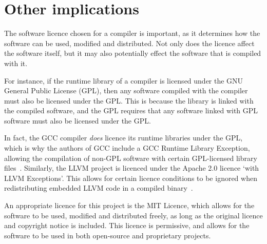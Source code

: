 \section{Other implications}

The software licence chosen for a compiler is important, as it determines how the software can be
used, modified and distributed. Not only does the licence affect the software itself, but it may
also potentially effect the software that is compiled with it.

For instance, if the runtime library of a compiler is licensed under the GNU General Public
License (GPL), then any software compiled with the compiler must also be licensed under the GPL.
This is because the library is linked with the compiled software, and the GPL requires that any
software linked with GPL software must also be licensed under the GPL.

In fact, the GCC compiler \emph{does} licence its runtime libraries under the GPL, which is why the
authors of GCC include a GCC Runtime Library Exception, allowing the compilation of non-GPL software
with certain GPL-licensed library files~\autocite{gcc-exception}. Similarly, the LLVM project is
licenced under the Apache 2.0 licence `with LLVM Exceptions'. This allows for certain licence conditions
to be ignored when redistributing embedded LLVM code in a compiled binary~\autocite{llvm-licence}.

An appropriate licence for this project is the MIT Licence, which allows for the software to be
used, modified and distributed freely, as long as the original licence and copyright notice is
included. This licence is permissive, and allows for the software to be used in both open-source and
proprietary projects.
